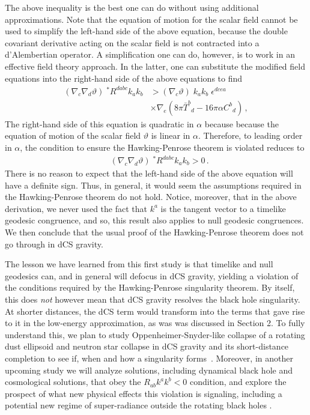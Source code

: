 \documentclass[prd,twocolumn,showpacs,superscriptaddress,nofootinbib]{revtex4-2}
\begin{document}
The above inequality is the best one can do without using additional approximations. Note that the equation of motion for the scalar field cannot be used to simplify the left-hand side of the above equation, because the double covariant derivative acting on the scalar field is not contracted into a d'Alembertian operator. A simplification one can do, however, is to work in an effective field theory approach. In the latter, one can substitute the modified field equations into the right-hand side of the above equations to find  
%
\begin{align}
\left(\nabla_{c} \nabla_{d} \vartheta \right) \; {}^{\ast}R^{dabc} k_{a}k_{b} &> \left(\nabla_{c} \vartheta \right) \; k_{a} k_{b} \; \epsilon^{dcea} 
\nonumber \\
& \times
\nabla_{e} \left(8 \pi \bar{T}^b{}_d - 16 \pi \alpha C^b{}_d\right) \,,
\end{align}
%
The right-hand side of this equation is quadratic in $\alpha$ because because the equation of motion of the scalar field $\vartheta$ is linear in $\alpha$. Therefore, to leading order in $\alpha$, the condition to ensure the Hawking-Penrose theorem is violated reduces to  
%
\begin{align}
&\left(\nabla_{c} \nabla_{d} \vartheta \right) \; {}^{\ast}R^{dabc} k_{a}k_{b} > 0\,.
\end{align}
%
There is no reason to expect that the left-hand side of the above equation will have a definite sign. Thus, in general, it would seem the assumptions required in the Hawking-Penrose theorem do not hold. Notice, moreover, that in the above derivation, we never used the fact that $k^a$ is the tangent vector to a timelike geodesic congruence, and so, this result also applies to null geodesic congruences. We then conclude that the usual proof of the Hawking-Penrose theorem does not go through in dCS gravity.




The lesson we have learned from this first study is that timelike and null geodesics can, and in general will defocus in dCS gravity, yielding a violation of the conditions required by the Hawking-Penrose singularity theorem. By itself, this does \textit{not} however mean that dCS gravity resolves the black hole singularity. At shorter distances, the dCS term would transform into the terms that gave rise to it in the low-energy approximation, as was was discussed in Section 2.  To fully understand this, we plan to study Oppenheimer-Snyder-like collapse of a rotating dust ellipsoid and neutron star collapse in dCS gravity and its short-distance completion to see if, when and how a singularity forms~\cite{AJY}. Moreover, in another upcoming study we will analyze solutions, including dynamical black hole and cosmological solutions, that obey the $R_{ab} k^a k^b < 0$ condition, and explore the prospect of what new physical effects this violation is signaling, including a potential new regime of super-radiance outside the rotating black holes \cite{AJGY}.  
\end{document}
